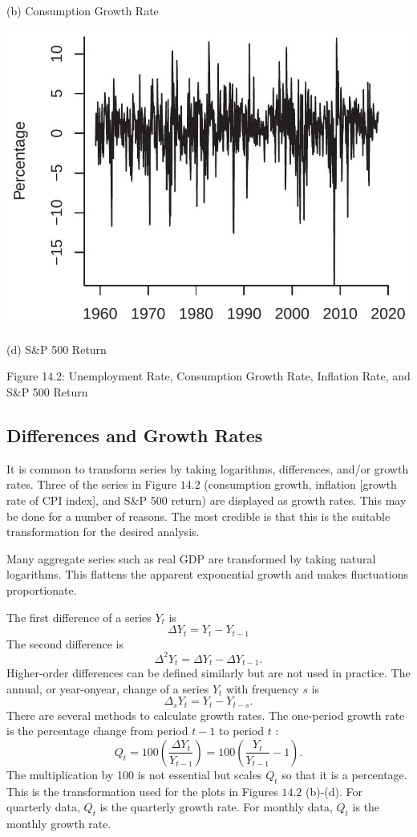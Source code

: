\documentclass[10pt]{article}
\begin{document}
(b) Consumption Growth Rate

\includegraphics[max width=\textwidth]{2022_10_23_6047885e7d154c9f28afg-03(3)}

(d) S\&P 500 Return

Figure 14.2: Unemployment Rate, Consumption Growth Rate, Inflation Rate, and S\&P 500 Return

\subsection{Differences and Growth Rates}
It is common to transform series by taking logarithms, differences, and/or growth rates. Three of the series in Figure $14.2$ (consumption growth, inflation [growth rate of CPI index], and S\&P 500 return) are displayed as growth rates. This may be done for a number of reasons. The most credible is that this is the suitable transformation for the desired analysis.

Many aggregate series such as real GDP are transformed by taking natural logarithms. This flattens the apparent exponential growth and makes fluctuations proportionate.

The first difference of a series $Y_{t}$ is
$$
\Delta Y_{t}=Y_{t}-Y_{t-1}
$$
The second difference is
$$
\Delta^{2} Y_{t}=\Delta Y_{t}-\Delta Y_{t-1} .
$$
Higher-order differences can be defined similarly but are not used in practice. The annual, or year-onyear, change of a series $Y_{t}$ with frequency $s$ is
$$
\Delta_{s} Y_{t}=Y_{t}-Y_{t-s} .
$$
There are several methods to calculate growth rates. The one-period growth rate is the percentage change from period $t-1$ to period $t$ :
$$
Q_{t}=100\left(\frac{\Delta Y_{t}}{Y_{t-1}}\right)=100\left(\frac{Y_{t}}{Y_{t-1}}-1\right) .
$$
The multiplication by 100 is not essential but scales $Q_{t}$ so that it is a percentage. This is the transformation used for the plots in Figures $14.2$ (b)-(d). For quarterly data, $Q_{t}$ is the quarterly growth rate. For monthly data, $Q_{t}$ is the monthly growth rate.
\end{document}

